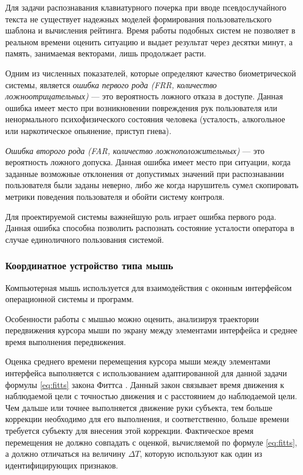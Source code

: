 Для задачи распознавания клавиатурного почерка при вводе псевдослучайного текста не существует надежных моделей формирования пользовательского шаблона и вычисления рейтинга. Время работы подобных систем не позволяет в реальном времени оценить ситуацию и выдает результат через десятки минут, а память, занимаемая векторами, лишь продолжает расти. \cite{keystroke}

Одним из численных показателей, которые определяют качество биометрической системы, является \textit{ошибка первого рода (FRR, количество ложноотрицательных)} --- это вероятность ложного отказа в доступе. Данная ошибка имеет место при возникновении повреждения рук пользователя или ненормального психофизического состояния человека (усталость, алкогольное или наркотическое опьянение, приступ гнева).\cite{keystroke}

\textit{Ошибка второго рода (FAR, количество ложноположительных)} --- это вероятность ложного допуска. Данная ошибка имеет место при ситуации, когда заданные возможные отклонения от допустимых значений при распознавании пользователя были заданы неверно, либо же когда нарушитель сумел скопировать метрики поведения пользователя и обойти систему контроля. \cite{keystroke}

Для проектируемой системы важнейшую роль играет ошибка первого рода. Данная ошибка способна позволить распознать состояние усталости оператора в случае единоличного пользования системой.

\subsubsection{Координатное устройство типа мышь}
Компьютерная мышь используется для взаимодействия с оконным интерфейсом операционной системы и программ.

Особенности работы с мышью можно оценить, анализируя траектории передвижения курсора мыши по экрану между элементами интерфейса и среднее время выполнения передвижения. \cite{recognitionOfPsycho}

Оценка среднего времени перемещения курсора мыши между элементами интерфейса выполняется с использованием адаптированной для данной задачи формулы \ref{eq:fitts} закона Фиттса \cite{fitts}. Данный закон связывает время движения к наблюдаемой цели с точностью движения и с расстоянием до наблюдаемой цели. Чем дальше или точнее выполняется движение руки субъекта, тем больше коррекции необходимо для его выполнения, и соответственно, больше времени требуется субъекту для внесения этой коррекции. Фактическое время перемещения не должно совпадать с оценкой, вычисляемой по формуле \ref{eq:fitts}, а должно отличаться на величину $\Delta T$, которую используют как один из идентифицирующих признаков. \cite{mouseMethod}

